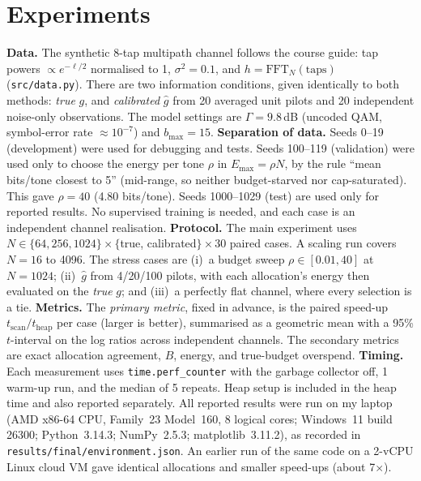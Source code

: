 \documentclass[10pt,a4paper]{article}
\begin{document}
\section{Experiments}
\textbf{Data.} The synthetic 8-tap multipath channel follows the course guide: tap powers $\propto e^{-\ell/2}$ normalised to 1,
$\sigma^2=0.1$, and $h=\mathrm{FFT}_N(\text{taps})$ (\texttt{src/data.py}). There are two information conditions, given identically
to both methods: \emph{true} $g$, and \emph{calibrated} $\hat g$ from 20 averaged unit pilots and 20 independent noise-only
observations. The model settings are $\Gamma=9.8$\,dB (uncoded QAM, symbol-error rate $\approx10^{-7}$) and $b_{\max}=15$.
\textbf{Separation of data.} Seeds 0--19 (development) were used for debugging and tests. Seeds 100--119 (validation) were used
only to choose the energy per tone $\rho$ in $E_{\max}=\rho N$, by the rule ``mean bits/tone closest to 5'' (mid-range, so neither
budget-starved nor cap-saturated). This gave $\rho=40$ (4.80 bits/tone). Seeds 1000--1029 (test) are used only for reported
results. No supervised training is needed, and each case is an independent channel realisation.
\textbf{Protocol.} The main experiment uses $N\in\{64,256,1024\}\times\{$true, calibrated$\}\times30$ paired cases. A scaling run
covers $N=16$ to 4096. The stress cases are (i)~a budget sweep $\rho\in[0.01,40]$ at $N=1024$; (ii)~$\hat g$ from 4/20/100 pilots,
with each allocation's energy then evaluated on the \emph{true} $g$; and (iii)~a perfectly flat channel, where every selection is a tie.
\textbf{Metrics.} The \emph{primary metric}, fixed in advance, is the paired speed-up $t_{\text{scan}}/t_{\text{heap}}$ per case
(larger is better), summarised as a geometric mean with a 95\% $t$-interval on the log ratios across independent channels. The
secondary metrics are exact allocation agreement, $B$, energy, and true-budget overspend.
\textbf{Timing.} Each measurement uses \texttt{time.perf\_counter} with the garbage collector off, 1 warm-up run, and the median of 5
repeats. Heap setup is included in the heap time and also reported separately. All reported results were run on my laptop
(AMD x86-64 CPU, Family~23 Model~160, 8 logical cores; Windows~11 build 26300; Python~3.14.3; NumPy~2.5.3; matplotlib~3.11.2),
as recorded in \texttt{results/final/environment.json}.
An earlier run of the same code on a 2-vCPU Linux cloud VM gave identical allocations and smaller speed-ups (about 7$\times$).
\end{document}
